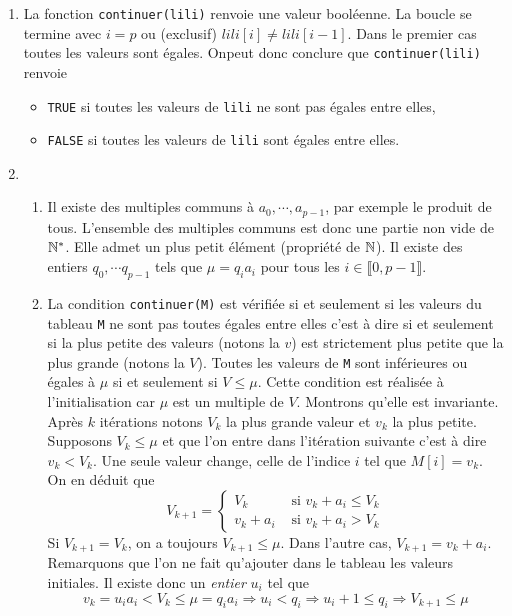 \begin{enumerate}
  \item La fonction \texttt{continuer(lili)} renvoie une valeur booléenne. La boucle se termine avec $i=p$ ou (exclusif) $lili[i] \neq lili[i-1]$. Dans le premier cas toutes les valeurs sont égales. Onpeut donc conclure que \texttt{continuer(lili)} renvoie 
\begin{itemize}
  \item \texttt{TRUE} si toutes les valeurs de \texttt{lili} ne sont pas égales entre elles,
  \item \texttt{FALSE} si toutes les valeurs de \texttt{lili} sont égales entre elles.
\end{itemize}

  
  \item
\begin{enumerate}
  \item Il existe des multiples communs à $a_0, \cdots , a_{p-1}$, par exemple le produit de tous. L'ensemble des multiples communs est donc une partie non vide de $\mathbb{N}^*$. Elle admet un plus petit élément (propriété de $\mathbb{N}$). Il existe des entiers $q_0,\cdots q_{p-1}$ tels que $\mu = q_ia_i$ pour tous les $i \in \llbracket 0, p-1\rrbracket$.
  
  \item La condition \texttt{continuer(M)} est vérifiée si et seulement si les valeurs du tableau \texttt{M} ne sont pas toutes égales entre elles c'est à dire si et seulement si la plus petite des valeurs (notons la $v$) est strictement plus petite que la plus grande (notons la $V$).\newline
  Toutes les valeurs de \texttt{M} sont inférieures ou égales à $\mu$ si et seulement si $V \leq \mu$. Cette condition est réalisée à l'initialisation car $\mu$ est un multiple de $V$. Montrons qu'elle est invariante.\newline
  Après $k$ itérations notons $V_k$ la plus grande valeur et $v_k$ la plus petite. Supposons $V_k\leq \mu$ et que l'on entre dans l'itération suivante c'est à dire $v_k < V_k$. Une seule valeur change, celle de l'indice $i$ tel que $M[i]=v_k$. On en déduit que
\begin{displaymath}
  V_{k+1}=
\left\lbrace 
\begin{aligned}
  V_k        &\text{ si } v_k + a_i \leq V_k \\
  v_k + a_i &\text{ si } v_k + a_i > V_k
\end{aligned}
\right. 
\end{displaymath}
Si $V_{k+1}=V_k$, on a toujours $V_{k+1}\leq \mu$. Dans l'autre cas, $V_{k+1}=v_k+a_i$. Remarquons que l'on ne fait qu'ajouter dans le tableau les valeurs initiales. Il existe donc un \emph{entier} $u_i$ tel que 
\begin{displaymath}
v_k = u_i a_i< V_k \leq \mu = q_i a_i \Rightarrow u_i < q_i  \Rightarrow u_i + 1 \leq q_i \Rightarrow V_{k+1} \leq \mu 
\end{displaymath}


\end{enumerate}
\end{enumerate}
